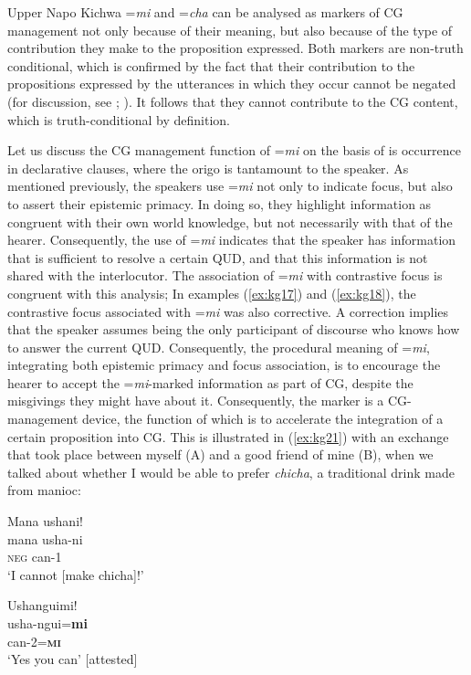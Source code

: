 \documentclass[output=paper]{langscibook}
\begin{document}
Upper Napo Kichwa =\textit{mi} and =\textit{cha} can be analysed as markers of CG management not only because of their meaning, but also because of the type of contribution they make to the proposition expressed. Both markers are non-truth conditional, which is confirmed by the fact that their contribution to the propositions expressed by the utterances in which they occur cannot be negated (for discussion, see \citealt[ch.5]{Grzech2016a}; \citeyear{Grzech2016b}). It follows that they cannot contribute to the CG content, which is truth-conditional by definition.

Let us discuss the CG management function of =\textit{mi} on the basis of is occurrence in declarative clauses, where the origo is tantamount to the speaker. As mentioned previously, the speakers use =\textit{mi} not only to indicate focus, but also to assert their epistemic primacy. In doing so, they highlight information as congruent with their own world knowledge, but not necessarily with that of the hearer. Consequently, the use of =\textit{mi} indicates that the speaker has information that is sufficient to resolve a certain QUD, and that this information is not shared with the interlocutor. The association of =\textit{mi} with contrastive focus is congruent with this analysis; In examples (\ref{ex:kg17}) and (\ref{ex:kg18}), the contrastive focus associated with =\textit{mi} was also corrective. A correction implies that the speaker assumes being the only participant of discourse who knows how to answer the current QUD. Consequently, the procedural meaning of =\textit{mi}, integrating both epistemic primacy and focus association, is to encourage the hearer to accept the =\textit{mi}-marked information as part of CG, despite the misgivings they might have about it. Consequently, the marker is a CG-management device, the function of which is to accelerate the integration of a certain proposition into CG. This is illustrated in (\ref{ex:kg21}) with an exchange that took place between myself (A) and a good friend of mine (B), when we talked about whether I would be able to prefer \textit{chicha}, a traditional drink made from manioc:

\begin{exe}
	\ex \label{ex:kg21}
	\begin{xlist}
		\ex \label{ex:kg21a}
		\glll Mana  ushani!\\
		mana   usha-ni\\
		\textsc{neg} can-1\\
		\trans ‘I cannot [make chicha]!’
		
		\ex  \label{ex:kg21b}
		\glll Ushanguimi!\\
		usha-ngui=\textbf{mi}\\
        can-2=\textbf{\textsc{mi}}\\
        \trans ‘Yes you can’ [attested]
	\end{xlist}
\end{exe}
\end{document}

